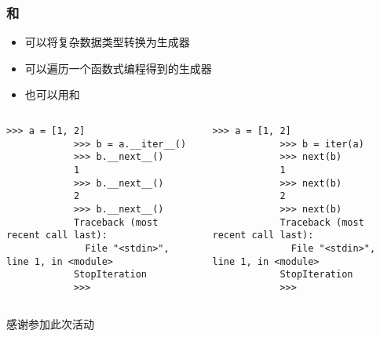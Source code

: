 \begin{frame} [fragile]
	\frametitle{和}
	\begin{itemize}
	\item {}可以将复杂数据类型转换为生成器
	\item {}可以遍历一个函数式编程得到的生成器
	\item 也可以用和
	\end{itemize}
	\begin{columns}
		\begin{column}[T]{.5\textwidth}
			\small
			\begin{lstlisting}[style=pythonstyle, gobble=12, texcl]
			>>> a = [1, 2]
			>>> b = a.__iter__()
			>>> b.__next__()
			1
			>>> b.__next__()
			2
			>>> b.__next__()
			Traceback (most recent call last):
			  File "<stdin>", line 1, in <module>
			StopIteration
			>>>
			\end{lstlisting}
		\end{column}
		\begin{column}[T]{.5\textwidth}
			\small
			\begin{lstlisting}[style=pythonstyle, gobble=12, texcl]
			>>> a = [1, 2]
			>>> b = iter(a)
			>>> next(b)
			1
			>>> next(b)
			2
			>>> next(b)
			Traceback (most recent call last):
			  File "<stdin>", line 1, in <module>
			StopIteration
			>>>
			\end{lstlisting}
		\end{column}
	\end{columns}
\end{frame}

\PreLastFrame
\begin{frame}
	\centerline{\fontsize{32}{32}\selectfont 感谢参加此次活动}
\end{frame}

\newpage


